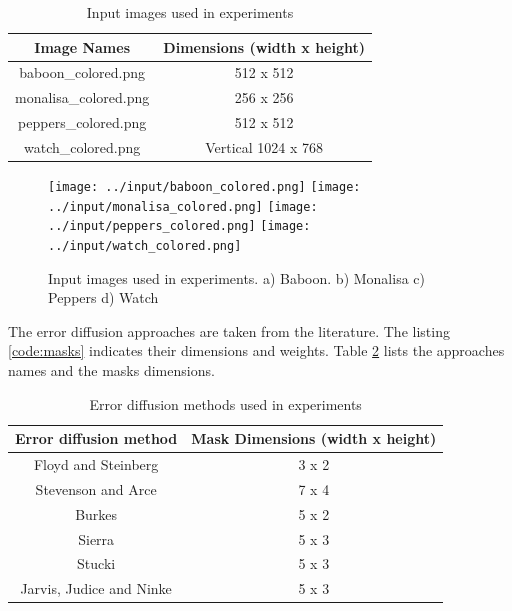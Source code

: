 \documentclass[]{IEEEtran}
\begin{document}
\begin{table}[h!]
\centering
\begin{center}
\begin{tabular}{ |c|c| } 
 \hline
 Image Names & Dimensions (width x height) \\
 \hline
  baboon\_colored.png &  512 x 512\\ 
 \hline
  monalisa\_colored.png & 256 x 256\\
 \hline
  peppers\_colored.png &  512 x 512\\ 
 \hline
  watch\_colored.png & Vertical 1024 x 768\\
 \hline
\end{tabular}
\caption{Input images used in experiments}
\label{table:input}
\end{center}
\end{table}

\begin{figure}[H]
  \centering
  \texttt{[image: ../input/baboon\_colored.png]}
  \texttt{[image: ../input/monalisa\_colored.png]}
  \texttt{[image: ../input/peppers\_colored.png]}
  \texttt{[image: ../input/watch\_colored.png]}
  \caption{Input images used in experiments. a) Baboon. b) Monalisa c) Peppers d) Watch}
  \label{fig:input-images}
\end{figure}

The error diffusion approaches are taken from the literature\cite{CLASS:1}. The listing \ref{code:masks} indicates their dimensions and weights. Table \ref{table:masks} lists the approaches names and the masks dimensions.

\begin{table}[h!]
  \centering
  \begin{center}
  \begin{tabular}{ |c|c| } 
   \hline
   Error diffusion method & Mask Dimensions (width x height) \\
   \hline
    Floyd and Steinberg &  3 x 2\\ 
   \hline
    Stevenson and Arce & 7 x 4\\
   \hline
    Burkes &  5 x 2\\ 
   \hline
    Sierra & 5 x 3\\
   \hline
    Stucki & 5 x 3\\
   \hline
    Jarvis, Judice and Ninke & 5 x 3 \\ 
   \hline
  \end{tabular}
  \caption{Error diffusion methods used in experiments}
  \label{table:masks}
  \end{center}
  \end{table}
\end{document}

